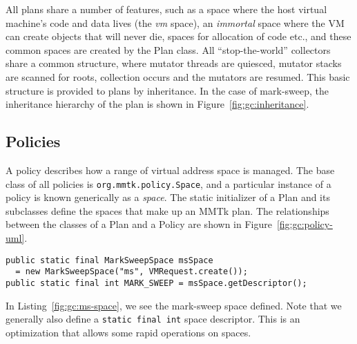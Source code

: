 All \mmtk plans share a number of features, such as a space where the host
virtual machine's code and data lives (the \emph{vm} space), an \emph{immortal}
space where the VM can create objects that will never die, spaces for allocation
of code etc., and these common spaces are created by the Plan class.  All
``stop-the-world'' collectors share a common structure, where mutator threads are quiesced, 
mutator stacks are scanned for roots, collection occurs and the
mutators are resumed.  This basic structure is provided to \mmtk plans by
inheritance.  In the case of mark-sweep, the inheritance hierarchy of the plan
is shown in Figure~\ref{fig:gc:inheritance}.

\begin{sidewaysfigure}

\caption{Inheritance hierarchy of the mark-sweep plan.}
\label{fig:gc:inheritance}
\end{sidewaysfigure}

\subsection{Policies}

\begin{sidewaysfigure}

\caption{Class relations between plans and policies.  The diagram shows a
subset of the relationships, illustrating two spaces: the small code space,
defined in the Plan for all MMTk plans, and the main mark-sweep space.}
\label{fig:gc:policy-uml}
\end{sidewaysfigure}

A policy describes how a range of virtual address space is managed.  
The base class of all policies is \lstinline|org.mmtk.policy.Space|, and a
particular instance of a policy is known generically as a \emph{space}.  
The static initializer of a Plan and its subclasses define the spaces that 
make up an MMTk plan.  The relationships between the classes of a Plan and a
Policy are shown in Figure~{\ref{fig:gc:policy-uml}}.
 
\begin{lstlisting}[name=MS.java,caption=\lstname: definition of the mark-sweep
space, label=fig:gc:ms-space]
public static final MarkSweepSpace msSpace 
  = new MarkSweepSpace("ms", VMRequest.create());
public static final int MARK_SWEEP = msSpace.getDescriptor();
\end{lstlisting}

In Listing~\ref{fig:gc:ms-space}, we see the mark-sweep space defined.  Note
that we generally also define a \lstinline|static final int| space descriptor.  This is
an optimization that allows some rapid operations on spaces.

